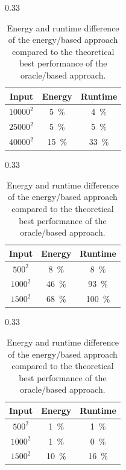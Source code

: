 \begin{table}[ht]
  \begin{subtable}{0.33\linewidth}
    \centering
    \begin{tabular}{ccc}\toprule
      Input & Energy & Runtime \\\midrule
      $10000^2$ & \qty{5}{\percent}  & \qty{4}{\percent} \\
      $25000^2$ & \qty{5}{\percent}  & \qty{5}{\percent} \\
      $40000^2$ & \qty{15}{\percent} & \qty{33}{\percent} \\
    \bottomrule\end{tabular}%
    \caption{Nine-point stencil.}%
    \label{tab:oracle-stencil}
  \end{subtable}%
  \hfill
  \begin{subtable}{0.33\linewidth}
    \centering
    \begin{tabular}{ccc}\toprule
      Input & Energy & Runtime \\\midrule
      $ 500^2$ & \qty{8}{\percent}  & \qty{8}{\percent} \\
      $1000^2$ & \qty{46}{\percent} & \qty{93}{\percent} \\
      $1500^2$ & \qty{68}{\percent} & \qty{100}{\percent} \\
    \bottomrule\end{tabular}%
    \caption{Matrix multiplication.}%
    \label{tab:oracle-matmul}
  \end{subtable}%
  \hfill
  \begin{subtable}{0.33\linewidth}
    \centering
    \begin{tabular}{ccc}\toprule
      Input & Energy & Runtime \\\midrule
      $ 500^2$ & \qty{1}{\percent}  & \qty{1}{\percent} \\
      $1000^2$ & \qty{1}{\percent}  & \qty{0}{\percent} \\
      $1500^2$ & \qty{10}{\percent} & \qty{16}{\percent} \\
    \bottomrule\end{tabular}%
    \caption{Rust implementation.}%
    \label{tab:oracle-rust}
  \end{subtable}%
  \caption{Energy and runtime difference of the energy\-/based approach compared to the theoretical best performance of the oracle\-/based approach.}%
  \label{fig:oracle}
\end{table}

